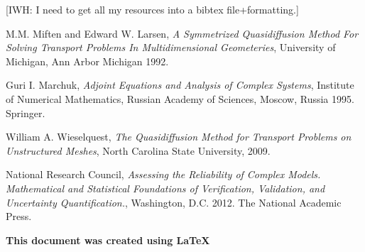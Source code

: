\documentclass{article}
\begin{document}
\newpage

{\color{red}[IWH: I need to get all my resources into a bibtex file+formatting.]}
\begin{thebibliography}{9}


  M.M. Miften and Edward W. Larsen, \emph{A Symmetrized Quasidiffusion Method For Solving Transport Problems In Multidimensional Geometeries}, University of Michigan, Ann Arbor Michigan 1992.
  
  
  Guri I. Marchuk, \emph{Adjoint Equations and Analysis of Complex Systems}, Institute of Numerical Mathematics, Russian Academy of Sciences, Moscow, Russia 1995. Springer.
  
  
  William A. Wieselquest, \emph{The Quasidiffusion Method for Transport Problems on Unstructured Meshes}, North Carolina State University, 2009.

  National Research Council, \emph{Assessing the Reliability of Complex Models. Mathematical and Statistical Foundations of Verification, Validation, and Uncertainty Quantification.}, Washington, D.C. 2012. The National Academic Press.



\end{thebibliography}

\textbf{This document was created using \LaTeX}
\end{document}
